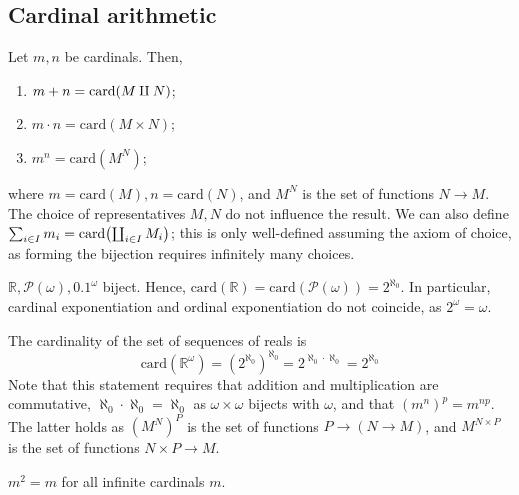 \subsection{Cardinal arithmetic}
Let \( m, n \) be cardinals.
Then,
\begin{enumerate}
    \item \( m + n = \mathrm{card}\qty(M \amalg N) \);
    \item \( m \cdot n = \mathrm{card}(M \times N) \);
    \item \( m^n = \mathrm{card}(M^N) \);
\end{enumerate}
where \( m = \mathrm{card}(M), n = \mathrm{card}(N) \), and \( M^N \) is the set of functions \( N \to M \).
The choice of representatives \( M, N \) do not influence the result.
We can also define \( \sum_{i \in I} m_i = \mathrm{card}\qty(\coprod_{i \in I} M_i) \); this is only well-defined assuming the axiom of choice, as forming the bijection requires infinitely many choices.
\begin{example}
    \( \mathbb R, \mathcal P(\omega), \qty{0,1}^\omega \) biject.
    Hence, \( \mathrm{card}(\mathbb R) = \mathrm{card}(\mathcal P(\omega)) = 2^{\aleph_0} \).
    In particular, cardinal exponentiation and ordinal exponentiation do not coincide, as \( 2^\omega = \omega \).

    The cardinality of the set of sequences of reals is
    \[ \mathrm{card}(\mathbb R^\omega) = (2^{\aleph_0})^{\aleph_0} = 2^{\aleph_0 \cdot \aleph_0} = 2^{\aleph_0} \]
    Note that this statement requires that addition and multiplication are commutative, \( \aleph_0 \cdot \aleph_0 = \aleph_0 \) as \( \omega \times \omega \) bijects with \( \omega \), and that \( (m^n)^p = m^{np} \).
    The latter holds as \( (M^N)^P \) is the set of functions \( P \to (N \to M) \), and \( M^{N \times P} \) is the set of functions \( N \times P \to M \).
\end{example}
\begin{theorem}
    \( m^2 = m \) for all infinite cardinals \( m \).
\end{theorem}
